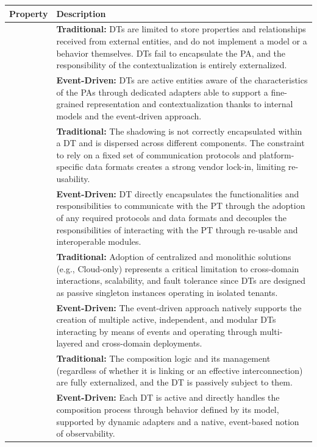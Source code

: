 \begin{table}
\renewcommand{\arraystretch}{1.2}
\centering
\small
\begin{tabularx}{\textwidth}{>{\arraybackslash}m{2.5cm} >{\arraybackslash}X}
\hline
\textbf{Property} & \textbf{Description} \\ \hline

\multirow{2}{*}{\parbox[t]{2.8cm}{\raggedright\arraybackslash\hspace{0pt}\textbf{Representativeness \& Contextualization}}}
& \textbf{Traditional:} DTs are limited to store properties and relationships received from external entities, and do not implement a model or a behavior themselves. DTs fail to encapsulate the PA, and the responsibility of the contextualization is entirely externalized. \\
& \textbf{Event-Driven:} DTs are active entities aware of the characteristics of the PAs through dedicated adapters able to support a fine-grained representation and contextualization thanks to internal models and the event-driven approach. \\ \hline

\multirow{2}{*}{\textbf{Shadowing}} 
& \textbf{Traditional:} The shadowing is not correctly encapsulated within a DT and is dispersed across different components. The constraint to rely on a fixed set of communication protocols and platform-specific data formats creates a strong vendor lock-in, limiting re-usability. \\
& \textbf{Event-Driven:} DT directly encapsulates the functionalities and responsibilities to communicate with the PT through the adoption of any required protocols and data formats and decouples the responsibilities of interacting with the PT through re-usable and interoperable modules. \\ \hline

\multirow{2}{*}{\textbf{Replication}} 
& \textbf{Traditional:} Adoption of centralized and monolithic solutions (e.g., Cloud-only) represents a critical limitation to cross-domain interactions, scalability, and fault tolerance since DTs are designed as passive singleton instances operating in isolated tenants. \\
& \textbf{Event-Driven:} The event-driven approach natively supports the creation of multiple active, independent, and modular DTs interacting by means of events and operating through multi-layered and cross-domain deployments. \\ \hline

\multirow{2}{*}{\textbf{Composability}} 
& \textbf{Traditional:} The composition logic and its management (regardless of whether it is linking or an effective interconnection) are fully externalized, and the DT is passively subject to them. \\
& \textbf{Event-Driven:} Each DT is active and directly handles the composition process through behavior defined by its model, supported by dynamic adapters and a native, event-based notion of observability. \\ \hline


\end{tabularx}
\end{table}
